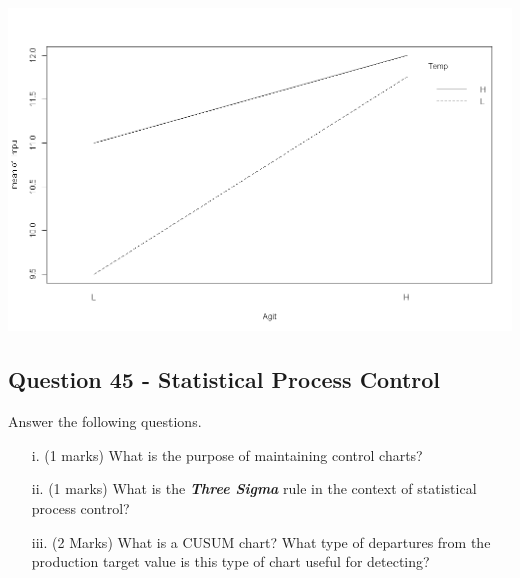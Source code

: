 \documentclass[a4paper,12pt]{article}
\begin{document}
\begin{center}
	\includegraphics[scale=0.3]{image/ExamQ6interactionc}
\end{center}

\newpage
\subsection*{Question 45 - Statistical Process Control}
Answer the following questions.

\begin{itemize}
	\item[i.] (1 marks) What is the purpose of maintaining control charts?
	\item[ii.] (1 marks) What is the \emph{\textbf{Three Sigma}} rule in the context of statistical process control?
	\item[iii.] (2 Marks) What is a CUSUM chart? What type of departures from the production target value
	is this type of chart useful for detecting?
\end{itemize}


\newpage
\end{document}
